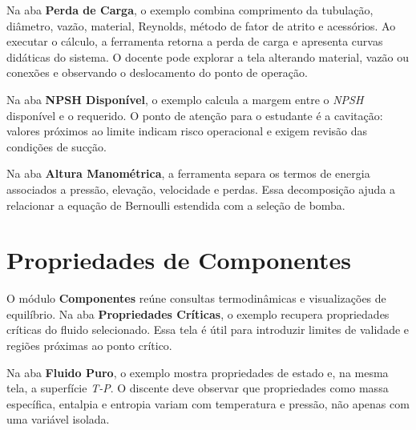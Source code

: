 Na aba \textbf{Perda de Carga}, o exemplo combina comprimento da tubulação, diâmetro, vazão, material, Reynolds, método de fator de atrito e acessórios. Ao executar o cálculo, a ferramenta retorna a perda de carga e apresenta curvas didáticas do sistema. O docente pode explorar a tela alterando material, vazão ou conexões e observando o deslocamento do ponto de operação.


Na aba \textbf{NPSH Disponível}, o exemplo calcula a margem entre o \textit{NPSH} disponível e o requerido. O ponto de atenção para o estudante é a cavitação: valores próximos ao limite indicam risco operacional e exigem revisão das condições de sucção.


Na aba \textbf{Altura Manométrica}, a ferramenta separa os termos de energia associados a pressão, elevação, velocidade e perdas. Essa decomposição ajuda a relacionar a equação de Bernoulli estendida com a seleção de bomba.


\section{Propriedades de Componentes}

O módulo \textbf{Componentes} reúne consultas termodinâmicas e visualizações de equilíbrio. Na aba \textbf{Propriedades Críticas}, o exemplo recupera propriedades críticas do fluido selecionado. Essa tela é útil para introduzir limites de validade e regiões próximas ao ponto crítico.


Na aba \textbf{Fluido Puro}, o exemplo mostra propriedades de estado e, na mesma tela, a superfície \textit{T-P}. O discente deve observar que propriedades como massa específica, entalpia e entropia variam com temperatura e pressão, não apenas com uma variável isolada.

